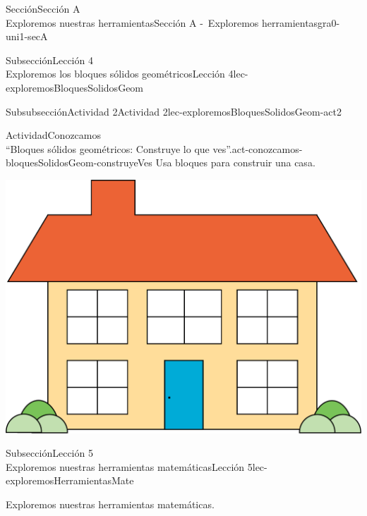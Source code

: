 \begin{sectionptx}{Sección}{{\Large Sección A\\}Exploremos nuestras herramientas}{}{Sección A -~Exploremos herramientas}{}{}{gra0-uni1-secA}
\begin{subsectionptx}{Subsección}{{\normalsize Lección 4\\[-0.05cm]}Exploremos los bloques sólidos geométricos}{}{Lección 4}{}{}{lec-exploremosBloquesSolidosGeom}
%
%
\typeout{************************************************}
\typeout{************************************************}
%
\begin{subsubsectionptx}{Subsubsección}{Actividad 2}{}{Actividad 2}{}{}{lec-exploremosBloquesSolidosGeom-act2}
\begin{activity}{Actividad}{Conozcamos\\“Bloques sólidos geométricos: Construye lo que ves”.}{act-conozcamos-bloquesSolidosGeom-construyeVes}%
Usa bloques para construir una casa.%
\begin{image}{0}{1}{0}{}%
\includegraphics[width=\linewidth, center]{external/png-source/house.png}
\end{image}%
\end{activity}%
\end{subsubsectionptx}
\end{subsectionptx}
%
%
\typeout{************************************************}
\typeout{************************************************}
%
\begin{subsectionptx}{Subsección}{{\normalsize Lección 5\\[-0.05cm]}Exploremos nuestras herramientas matemáticas}{}{Lección 5}{}{}{lec-exploremosHerramientasMate}
\begin{introduction}{}%
Exploremos nuestras herramientas matemáticas.%
\end{introduction}%

\end{subsectionptx}
\end{sectionptx}
